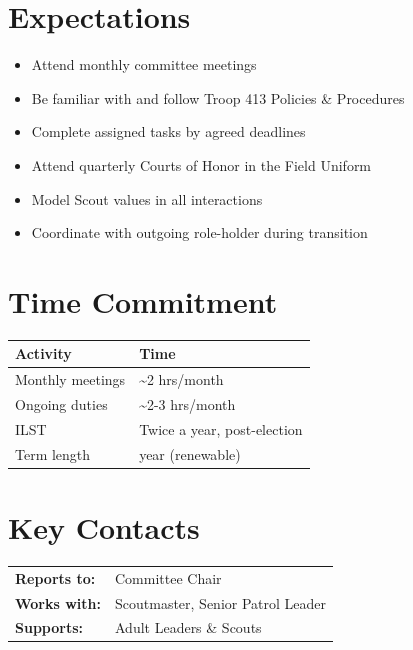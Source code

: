\documentclass[11pt, letterpaper]{article}
\begin{document}
\hfill
\begin{minipage}[t]{0.48\linewidth}
\raggedright

\section{Expectations}
\begin{itemize}
  \item Attend monthly committee meetings
  \item Be familiar with and follow Troop 413 Policies \& Procedures
  \item Complete assigned tasks by agreed deadlines
  \item Attend quarterly Courts of Honor in the Field Uniform
  \item Model Scout values in all interactions
  \item Coordinate with outgoing role-holder during transition
\end{itemize}

\section{Time Commitment}
\begin{tabular}{@{}p{3.0cm} >{\raggedright\arraybackslash}p{3.8cm}@{}}
  \toprule
  \textbf{Activity} & \textbf{Time} \\
  \midrule
  Monthly meetings  & \textasciitilde{}2 hrs/month \\
  Ongoing duties    & \textasciitilde{}2-3 hrs/month \\
  ILST              & Twice a year, post-election \\
  Term length       & 1 year (renewable) \\
  \bottomrule
\end{tabular}

\vspace{1em}

\section{Key Contacts}
\begin{tabular}{@{}p{2.6cm} >{\raggedright\arraybackslash}p{4.2cm}@{}}
  \textbf{Reports to:}  & Committee Chair \\
  \textbf{Works with:}  & Scoutmaster, Senior Patrol Leader \\
  \textbf{Supports:}    & Adult Leaders \& Scouts \\
\end{tabular}

\end{minipage}
\end{document}
